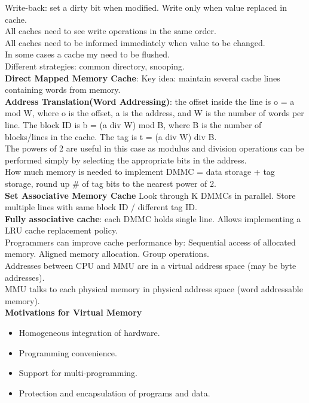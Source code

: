 \documentclass[letterpaper, 8pt]{extarticle}
\begin{document}
\begin{multicols*}{6}
	Write-back: set a dirty bit when modified. Write only when value replaced in cache.\\
	All caches need to see write operations in the same order.\\
	All caches need to be informed immediately when value to be changed.\\
	In some cases a cache my need to be flushed.\\
	Different strategies: common directory, snooping.\\
	\textbf{Direct Mapped Memory Cache}: Key idea: maintain several cache lines containing words from memory.\\
	\textbf{Address Translation(Word Addressing)}: the offset inside the line is o = a mod W, where o is the offset, a is the address, and W is the number of words per line. The block ID is b = (a div W) mod B, where B is the number of blocks/lines in the cache. The tag is t = (a div W) div B.\\
	The powers of 2 are useful in this case as modulus and division operations can be performed simply by selecting the appropriate bits in the address.\\
	How much memory is needed to implement DMMC = data storage + tag storage, round up \# of tag bits to the nearest power of 2.\\
	\textbf{Set Associative Memory Cache} Look through K DMMCs in parallel. Store multiple lines with same block ID / different tag ID.\\
	\textbf{Fully associative cache}: each DMMC holds single line. Allows implementing a LRU cache replacement policy.\\
	Programmers can improve cache performance by: Sequential access of allocated memory. Aligned memory allocation. Group operations.\\
	Addresses between CPU and MMU are in a virtual address space (may be byte addresses).\\
	MMU talks to each physical memory in physical address space (word addressable memory).\\
	\textbf{Motivations for Virtual Memory}
	\begin{itemize}
	\item Homogeneous integration of hardware.
	\item Programming convenience.
	\item Support for multi-programming.
	\item Protection and encapsulation of programs and data.
	\end{itemize}

\end{multicols*}
\end{document}
